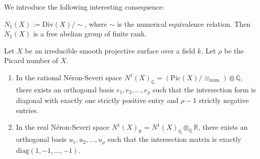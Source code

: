 We introduce the following interesting consequence:

\begin{lemma}
    $N_1(X):= \mathrm{Div}(X)/\sim$, where $\sim$ is the numerical equivalence relation.
Then $N_1(X)$ is a free abelian group of finite rank.
\end{lemma}

\begin{corollary}
    Let $X$ be an irreducible smooth projective surface over a field $k$. Let $\rho$ be the Picard number of $X$. 
\begin{enumerate}
    \item[(a)] In the rational N\'eron-Severi space $N^1(X)_\mathbb{Q} = ( \text{Pic}(X) / \equiv_{\text{num}} ) \otimes \mathbb{Q}$, there exists an orthogonal basis $e_1, e_2, \dots, e_\rho$ such that the intersection form is diagonal with exactly one strictly positive entry and $\rho-1$ strictly negative entries.
    \item[(b)] In the real N\'eron-Severi space $N^1(X)_\mathbb{R} = N^1(X)_\mathbb{Q} \otimes_\mathbb{Q} \mathbb{R}$, there exists an orthogonal basis $u_1, u_2, \dots, u_\rho$ such that the intersection matrix is exactly $\text{diag}(1, -1, \dots, -1)$.
\end{enumerate}
\end{corollary}

